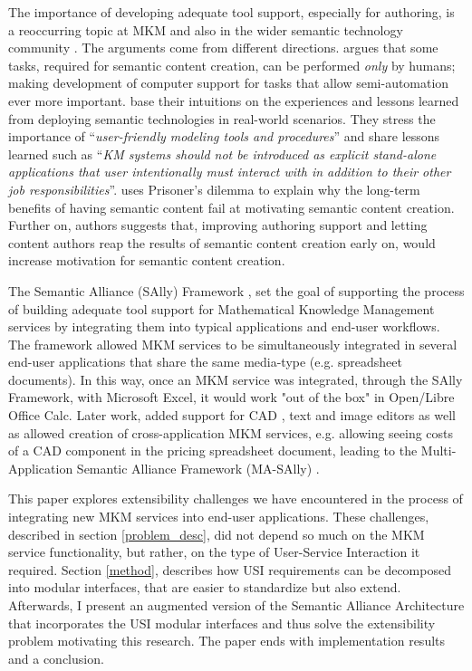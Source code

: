 \documentclass{llncs}
\begin{document}
The importance of developing adequate tool support, especially for authoring, is a reoccurring topic at MKM \cite{cpoint} and also in the wider semantic technology community \cite{stenmark2004integrating, joo2011adoption, siorpaes2010human}. The arguments come from different directions. \cite{siorpaes2010human} argues that some tasks, required for semantic content creation, can be performed \textit{only} by humans; making development of computer support for tasks that allow semi-automation ever more important. \cite{stenmark2004integrating, joo2011adoption} base their intuitions on the experiences and lessons learned from deploying semantic technologies in real-world scenarios. They stress the importance of ``\textit{user-friendly modeling tools and procedures}''\cite{joo2011adoption} and share lessons learned such as ``\textit{KM systems should not be introduced as explicit stand-alone applications that user intentionally must interact with in addition to their other job responsibilities}''\cite{stenmark2004integrating}. \cite{cpoint} uses Prisoner's dilemma to explain why the long-term benefits of having semantic content fail at motivating semantic content creation. Further on, authors suggests that, improving authoring support and letting content authors reap the results of semantic content creation early on, would increase motivation for semantic content creation. 


The Semantic Alliance (SAlly) Framework \cite{DavJucKoh:safusa12}, set the goal of supporting the process of building adequate tool support for Mathematical Knowledge Management services by integrating them into typical applications and end-user workflows. The framework allowed MKM services to be simultaneously integrated in several end-user applications that share the same media-type (e.g. spreadsheet documents). In this way, once an MKM service was integrated, through the SAlly Framework, with Microsoft Excel, it would work "out of the box" in Open/Libre Office Calc. Later work, added support for CAD \cite{KohlhaseEtAl:FullSemanticTransparency:2013}, text and image \cite{design2014} editors as well as allowed creation of cross-application MKM services, e.g. allowing seeing costs of a CAD component in the pricing spreadsheet document, leading to the Multi-Application Semantic Alliance Framework (MA-SAlly) \cite{KohlhaseEtAl:FullSemanticTransparency:2013}. 


This paper explores extensibility challenges we have encountered in the process of integrating new MKM services into end-user applications. These challenges, described in section \ref{problem_desc}, did not depend so much on the MKM service functionality, but rather, on the type of User-Service Interaction it required. Section \ref{method}, describes how USI requirements can be decomposed into modular interfaces, that are easier to standardize but also extend. Afterwards, I present an augmented version of the Semantic Alliance Architecture that incorporates the USI modular interfaces and thus solve the extensibility problem motivating this research. The paper ends with implementation results and a conclusion.
\end{document}
